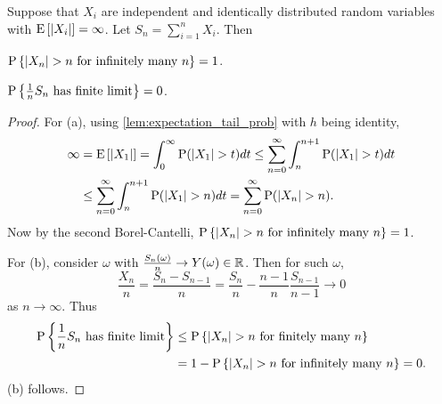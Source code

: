 \begin{proposition}
    Suppose that $X_i$ are independent and identically distributed random variables with 
    $\operatorname{E}\left[ {\left\lvert {X_i} \right\rvert} \right]=\infty$. Let $S_n = \sum_{i=1}^nX_i$. Then 
    \begin{thmenum}
        \item $\operatorname{P}\left\{ {\left\lvert {X_n} \right\rvert>n\text{ for infinitely many $n$}} \right\} = 1$. 
        \item $\operatorname{P}\left\{ {\frac{1}{n}S_n\text{ has finite limit}} \right\} = 0$. 
    \end{thmenum}
\end{proposition}
\begin{proof}
    For (a), using \cref{lem:expectation_tail_prob} with $h$ being identity, 
    \begin{equation*}
        \begin{split}
            \infty &= \operatorname{E}\left[ {\left\lvert {X_1} \right\rvert} \right] = \int_0^\infty\operatorname{P}(\left\lvert {X_1} \right\rvert>t)dt  
            \leq \sum_{n=0}^\infty\int_n^{n+1}\operatorname{P}(\left\lvert {X_1} \right\rvert>t)dt \\
            &\leq \sum_{n=0}^\infty\int_n^{n+1}\operatorname{P}(\left\lvert {X_1} \right\rvert>n)dt 
            = \sum_{n=0}^\infty\operatorname{P}(\left\lvert {X_n} \right\rvert>n). 
        \end{split}
    \end{equation*}
    Now by the second Borel-Cantelli, $\operatorname{P}\left\{ {\left\lvert {X_n} \right\rvert>n\text{ for infinitely many $n$}} \right\} = 1$. 

    For (b), consider $\omega$ with $\frac{S_n(\omega)}{n}\to Y(\omega)\in\mathbb{R}$. 
    Then for such $\omega$, 
    \begin{equation*}
        \frac{X_n}{n} = \frac{S_n - S_{n-1}}{n} = \frac{S_n}{n} - \frac{n-1}{n}\frac{S_{n-1}}{n-1}\to 0
    \end{equation*}
    as $n\to\infty$. Thus 
    \begin{equation*}
        \begin{split}
            \operatorname{P}\left\{ {\frac{1}{n}S_n\text{ has finite limit}} \right\} &\leq \operatorname{P}\left\{ {\left\lvert {X_n} \right\rvert>n\text{ for finitely many }n} \right\} \\
            &= 1 - \operatorname{P}\left\{ {\left\lvert {X_n} \right\rvert>n\text{ for infinitely many $n$}} \right\} = 0.           
        \end{split}
    \end{equation*}
    (b) follows. 
\end{proof}